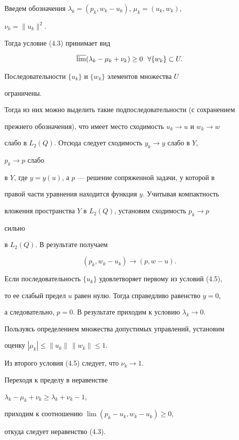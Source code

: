 \begin{pf} 


Введем обозначения $\lambda_k=(p_k,w_k-u_k)$, $\mu_k=(u_k,w_k)$, 


$\nu_k=\|u_k\|^2$. 


Тогда условие (4.3) принимает вид 


$$ 


\varlimsup(\lambda_k-\mu_k+\nu_k)\ge0\ \ \forall\{w_k\}\subset U. 


$$ 


 


Последовательности $\{u_k\}$ и $\{w_k\}$ элементов множества $U$ 


ограничены. 


Тогда из них можно выделить такие подпоследовательности (с сохранением 


прежнего обозначения), что имеет место сходимость $u_k\to u$ и $w_k\to w$ 


слабо в $L_2(Q)$. Отсюда следует сходимость $y_k\to y$ слабо в $Y$, 


$p_k\to p$ слабо 


в $Y$, где $y=y(u)$, а $p$ --- решение сопряженной задачи, у которой в 


правой части уравнения находится функция $y$. Учитывая компактность 


вложения пространства $Y$ в $L_2(Q)$, установим сходимость $p_k\to p$ 


сильно 


в $L_2(Q)$. В результате получаем 


$$ 


(p_k,w_k-u_k)\to(p,w-u). 


$$ 


Если последовательность $\{u_k\}$ удовлетворяет первому из условий (4.5), 


то ее слабый предел $u$ равен нулю. Тогда справедливо равенство $y=0$, 


а следовательно, $p=0$. В результате приходим к условию $\lambda_k\to0$. 


Пользуясь определением множества допустимых управлений, установим 


оценку $|\mu_k|\le\|u_k\|\,\|w_k\|\le1$. 


Из второго условия (4.5) следует, что $\nu_k\to1$. 


 


Переходя к пределу в неравенстве 


$\lambda_k-\mu_k+\nu_k\ge\lambda_k+\nu_k-1$, 


приходим к соотношению $\lim(p_k-u_k,w_k-u_k)\ge0$, 


откуда следует неравенство (4.3). 


\end{pf} 


